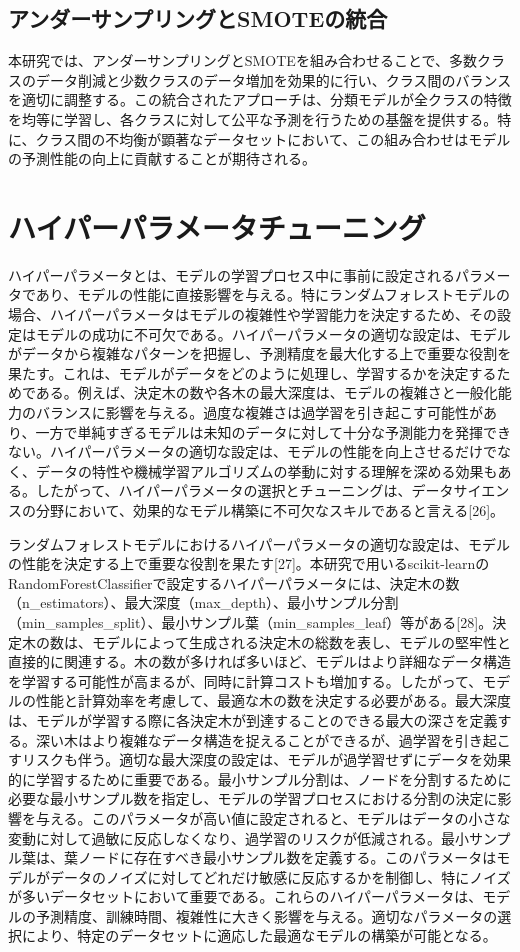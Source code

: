 \documentclass[platex]{suribt}
\begin{document}
\subsection{アンダーサンプリングとSMOTEの統合}
本研究では、アンダーサンプリングとSMOTEを組み合わせることで、多数クラスのデータ削減と少数クラスのデータ増加を効果的に行い、クラス間のバランスを適切に調整する。この統合されたアプローチは、分類モデルが全クラスの特徴を均等に学習し、各クラスに対して公平な予測を行うための基盤を提供する。特に、クラス間の不均衡が顕著なデータセットにおいて、この組み合わせはモデルの予測性能の向上に貢献することが期待される。
\section{ハイパーパラメータチューニング}
ハイパーパラメータとは、モデルの学習プロセス中に事前に設定されるパラメータであり、モデルの性能に直接影響を与える。特にランダムフォレストモデルの場合、ハイパーパラメータはモデルの複雑性や学習能力を決定するため、その設定はモデルの成功に不可欠である。ハイパーパラメータの適切な設定は、モデルがデータから複雑なパターンを把握し、予測精度を最大化する上で重要な役割を果たす。これは、モデルがデータをどのように処理し、学習するかを決定するためである。例えば、決定木の数や各木の最大深度は、モデルの複雑さと一般化能力のバランスに影響を与える。過度な複雑さは過学習を引き起こす可能性があり、一方で単純すぎるモデルは未知のデータに対して十分な予測能力を発揮できない。ハイパーパラメータの適切な設定は、モデルの性能を向上させるだけでなく、データの特性や機械学習アルゴリズムの挙動に対する理解を深める効果もある。したがって、ハイパーパラメータの選択とチューニングは、データサイエンスの分野において、効果的なモデル構築に不可欠なスキルであると言える[26]。

ランダムフォレストモデルにおけるハイパーパラメータの適切な設定は、モデルの性能を決定する上で重要な役割を果たす[27]。本研究で用いるscikit-learnのRandomForestClassifierで設定するハイパーパラメータには、決定木の数（n\_estimators）、最大深度（max\_depth）、最小サンプル分割（min\_samples\_split）、最小サンプル葉（min\_samples\_leaf）等がある[28]。決定木の数は、モデルによって生成される決定木の総数を表し、モデルの堅牢性と直接的に関連する。木の数が多ければ多いほど、モデルはより詳細なデータ構造を学習する可能性が高まるが、同時に計算コストも増加する。したがって、モデルの性能と計算効率を考慮して、最適な木の数を決定する必要がある。最大深度は、モデルが学習する際に各決定木が到達することのできる最大の深さを定義する。深い木はより複雑なデータ構造を捉えることができるが、過学習を引き起こすリスクも伴う。適切な最大深度の設定は、モデルが過学習せずにデータを効果的に学習するために重要である。最小サンプル分割は、ノードを分割するために必要な最小サンプル数を指定し、モデルの学習プロセスにおける分割の決定に影響を与える。このパラメータが高い値に設定されると、モデルはデータの小さな変動に対して過敏に反応しなくなり、過学習のリスクが低減される。最小サンプル葉は、葉ノードに存在すべき最小サンプル数を定義する。このパラメータはモデルがデータのノイズに対してどれだけ敏感に反応するかを制御し、特にノイズが多いデータセットにおいて重要である。これらのハイパーパラメータは、モデルの予測精度、訓練時間、複雑性に大きく影響を与える。適切なパラメータの選択により、特定のデータセットに適応した最適なモデルの構築が可能となる。
\end{document}
